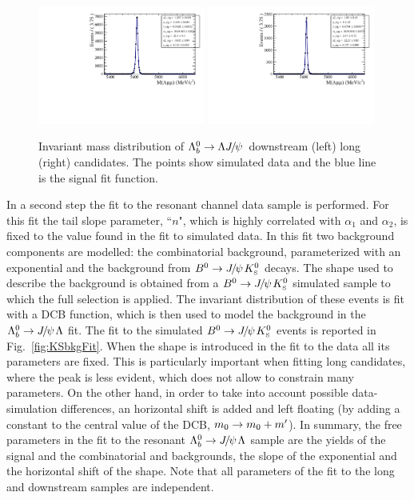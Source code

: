\begin{figure}
\centering
\includegraphics[width=0.49\textwidth]{Lmumu/figs/MassFits/fitLb2JpsiL_DD_MC.pdf}
\includegraphics[width=0.49\textwidth]{Lmumu/figs/MassFits/fitLb2JpsiL_LL_MC.pdf}
\caption{Invariant mass distribution of $\Lb\ra\Lz\jpsi$ downstream (left) long (right) candidates.
The points show simulated data and the blue line is the signal fit function.}
\label{fig:Lb_jpsiMCfit}
\end{figure}

In a second step the fit to the resonant channel data sample is performed.
For this fit the tail slope parameter, ``$n$", which is highly correlated
with $\alpha_1$ and $\alpha_2$, is fixed to the value found in the fit to simulated data.
In this fit two background components are modelled: the combinatorial background,
parameterized with an exponential and the background from $\Bz\ra\jpsi\KS$ decays.
The shape used to describe the \KS background is obtained from a $\Bz\ra\jpsi\KS$ simulated
sample to which the full selection is applied. The invariant distribution of these events
is fit with a DCB function, which is then used to model the \KS background
in the $\Lb\to\jpsi\Lz$ fit. The fit to the simulated $\Bz\ra\jpsi\KS$ events
is reported in Fig.~\ref{fig:KSbkgFit}. When the \KS shape is introduced in the fit to the data all
its parameters are fixed. This is particularly important when fitting long candidates, where the \KS
peak is less evident, which does not allow to constrain many parameters. On the other hand, in order
to take into account possible data-simulation differences, an horizontal shift is added and left
floating (by adding a constant to the central value of the DCB, $m_0 \rightarrow m_0 + m'$).
In summary, the free parameters in the fit to the resonant $\Lb\to\jpsi\Lz$ sample
are the yields of the signal and the combinatorial and \KS backgrounds, the slope
of the exponential and the horizontal shift of the \KS shape. Note that all parameters
of the fit to the long and downstream samples are independent.

